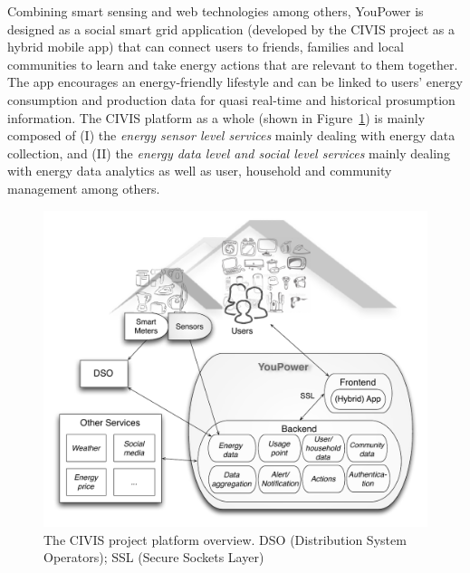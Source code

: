 
Combining smart sensing and web technologies among others,
YouPower is designed as a social smart grid application (developed by the CIVIS project as a hybrid mobile app) that can connect users to friends, families and local communities to learn and take energy actions that are relevant to them together. The app encourages an energy-friendly lifestyle and can be linked to users' energy consumption and production data for quasi real-time and historical prosumption information. 
% 
%
The CIVIS platform as a whole (shown in Figure~\ref{fig:platform}) is mainly composed of (I) the \textit{energy sensor level services} mainly
dealing with energy data collection, and (II) the \textit{energy data level and social
level services} mainly dealing with energy data analytics as well as user, household and community management
among others. 

\begin{figure}[h!]
\sidecaption[t]
	\includegraphics[width=.64\linewidth]{img/civis_platform_overview.pdf} %
	\caption{The CIVIS project platform overview. DSO (Distribution System Operators); SSL (Secure Sockets Layer)}\label{fig:platform}
\end{figure}


